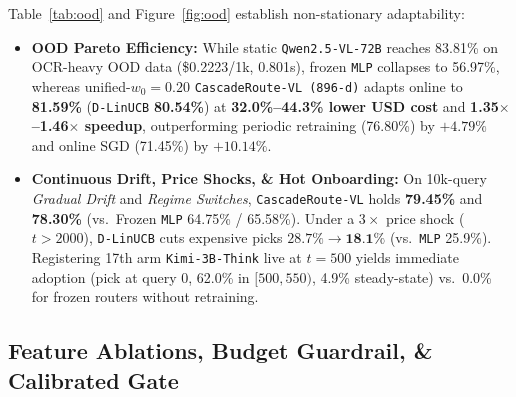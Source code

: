 \documentclass[10pt,twocolumn,letterpaper]{article}
\begin{document}
Table~\ref{tab:ood} and Figure~\ref{fig:ood} establish non-stationary adaptability:
\begin{itemize}
    \item \textbf{OOD Pareto Efficiency:} While static \texttt{Qwen2.5-VL-72B} reaches 83.81\% on OCR-heavy OOD data (\$0.2223/1k, 0.801s), frozen \texttt{MLP} collapses to 56.97\%, whereas unified-$w_0{=}0.20$ \texttt{CascadeRoute-VL (896-d)} adapts online to \textbf{81.59\%} (\texttt{D-LinUCB} \textbf{80.54\%}) at \textbf{32.0\%--44.3\% lower USD cost} and \textbf{1.35$\times$--1.46$\times$ speedup}, outperforming periodic retraining (76.80\%) by $+4.79\%$ and online SGD (71.45\%) by $+10.14\%$.
    \item \textbf{Continuous Drift, Price Shocks, \& Hot Onboarding:} On 10k-query \emph{Gradual Drift} and \emph{Regime Switches}, \texttt{CascadeRoute-VL} holds \textbf{79.45\%} and \textbf{78.30\%} (vs.\ Frozen \texttt{MLP} 64.75\% / 65.58\%). Under a $3\times$ price shock ($t{>}2000$), \texttt{D-LinUCB} cuts expensive picks $28.7\% \to \textbf{18.1\%}$ (vs.\ \texttt{MLP} 25.9\%). Registering 17th arm \texttt{Kimi-3B-Think} live at $t{=}500$ yields immediate adoption (pick at query $0$, 62.0\% in $[500, 550)$, 4.9\% steady-state) vs.\ 0.0\% for frozen routers without retraining.
\end{itemize}

\subsection{Feature Ablations, Budget Guardrail, \& Calibrated Gate}
\label{sec:ablations}
\label{sec:budgets_gates}
\end{document}
